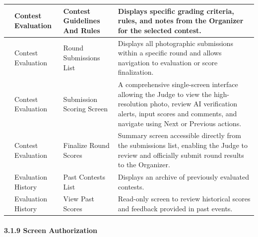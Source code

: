 \begin{longtable}{|>{\centering\arraybackslash}p{}|>{\raggedright\arraybackslash}p{}|>{\raggedright\arraybackslash}p{}|>{\raggedright\arraybackslash}p{}|}
\hline
8 & Contest Evaluation & Contest Guidelines And Rules & Displays specific grading criteria, rules, and notes from the Organizer for the selected contest. \\
\hline
9 & Contest Evaluation & Round Submissions List & Displays all photographic submissions within a specific round and allows navigation to evaluation or score finalization. \\
\hline
10 & Contest Evaluation & Submission Scoring Screen & A comprehensive single-screen interface allowing the Judge to view the high-resolution photo, review AI verification alerts, input scores and comments, and navigate using Next or Previous actions. \\
\hline
11 & Contest Evaluation & Finalize Round Scores & Summary screen accessible directly from the submissions list, enabling the Judge to review and officially submit round results to the Organizer. \\
\hline
12 & Evaluation History & Past Contests List & Displays an archive of previously evaluated contests. \\
\hline
13 & Evaluation History & View Past Scores & Read-only screen to review historical scores and feedback provided in past events. \\
\hline
\end{longtable}

\paragraph*{3.1.9 Screen Authorization}
\label{par:screen-authorization}

